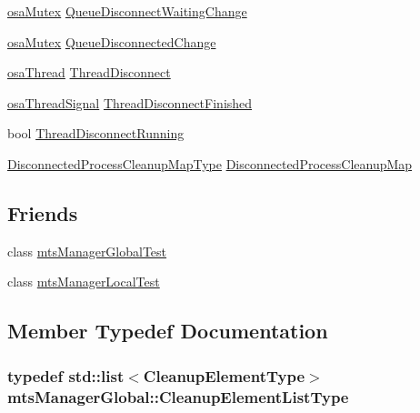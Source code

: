 \begin{DoxyCompactItemize}
\item 
\hyperlink{classosa_mutex}{osa\+Mutex} \hyperlink{classmts_manager_global_a900d74d93bb72e9420cd6094104c4c4e}{Queue\+Disconnect\+Waiting\+Change}
\item 
\hyperlink{classosa_mutex}{osa\+Mutex} \hyperlink{classmts_manager_global_aa4f774cb03c179504e84c3e5a36452b9}{Queue\+Disconnected\+Change}
\item 
\hyperlink{classosa_thread}{osa\+Thread} \hyperlink{classmts_manager_global_ac2dfc08c1931e1128145317e2499112f}{Thread\+Disconnect}
\item 
\hyperlink{classosa_thread_signal}{osa\+Thread\+Signal} \hyperlink{classmts_manager_global_a97940aadb7eeb7697a4174a929483def}{Thread\+Disconnect\+Finished}
\item 
bool \hyperlink{classmts_manager_global_a37a0b3f81f160ab240bb99924f52bf26}{Thread\+Disconnect\+Running}
\item 
\hyperlink{classmts_manager_global_a9df2055466c1e6a041ae3abc266fe507}{Disconnected\+Process\+Cleanup\+Map\+Type} \hyperlink{classmts_manager_global_ac3feb6deab8ad8d30b35000c776f4a9e}{Disconnected\+Process\+Cleanup\+Map}
\end{DoxyCompactItemize}
\subsection*{Friends}
\begin{DoxyCompactItemize}
\item 
class \hyperlink{classmts_manager_global_aad203c194c05c2d9063ff2face4590be}{mts\+Manager\+Global\+Test}
\item 
class \hyperlink{classmts_manager_global_adc2ae8db48d5418c526f275aafa3d4a9}{mts\+Manager\+Local\+Test}
\end{DoxyCompactItemize}


\subsection{Member Typedef Documentation}
\hypertarget{classmts_manager_global_a2e81b6e4dd89cef56e621cac95944bfd}{}
\subsubsection[{Cleanup\+Element\+List\+Type}]{\setlength{\rightskip}{0pt plus 5cm}typedef std\+::list$<${\bf Cleanup\+Element\+Type}$>$ {\bf mts\+Manager\+Global\+::\+Cleanup\+Element\+List\+Type}\hspace{0.3cm}{\ttfamily [protected]}}\label{classmts_manager_global_a2e81b6e4dd89cef56e621cac95944bfd}
\hypertarget{classmts_manager_global_a52d8af643eef029ad83e5e430604261a}{}
